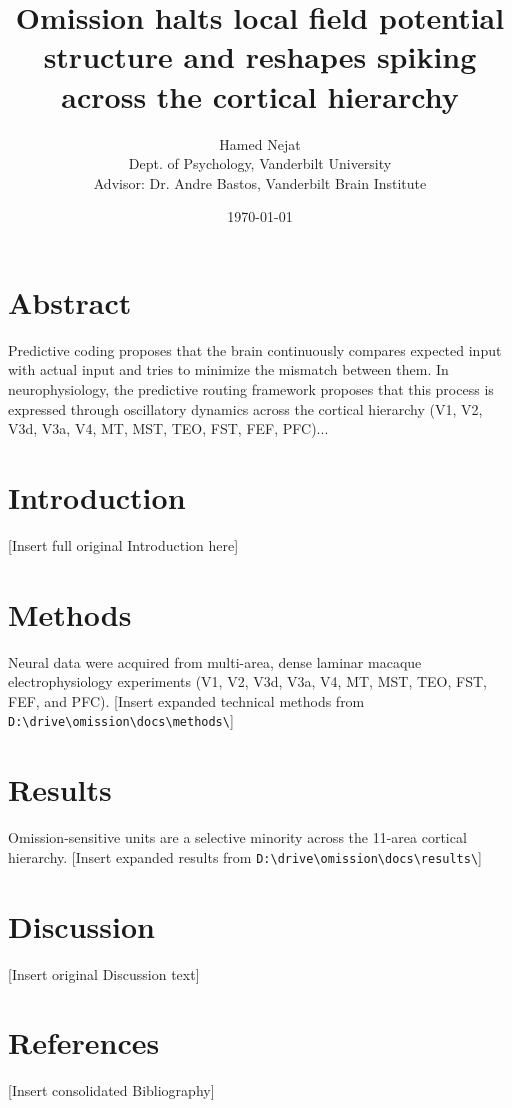 \documentclass[12pt]{article}
\title{Omission halts local field potential structure and reshapes spiking across the cortical hierarchy}
\author{Hamed Nejat \\ Dept. of Psychology, Vanderbilt University \\ Advisor: Dr. Andre Bastos, Vanderbilt Brain Institute}
\date{\today}
\begin{document}
\maketitle

\section*{Abstract}
Predictive coding proposes that the brain continuously compares expected input with actual input and tries to minimize the mismatch between them. In neurophysiology, the predictive routing framework proposes that this process is expressed through oscillatory dynamics across the cortical hierarchy (V1, V2, V3d, V3a, V4, MT, MST, TEO, FST, FEF, PFC)...

\section{Introduction}
[Insert full original Introduction here]

\section{Methods}
Neural data were acquired from multi-area, dense laminar macaque electrophysiology experiments (V1, V2, V3d, V3a, V4, MT, MST, TEO, FST, FEF, and PFC). 
[Insert expanded technical methods from \texttt{D:\textbackslash drive\textbackslash omission\textbackslash docs\textbackslash methods\textbackslash}]

\section{Results}
Omission-sensitive units are a selective minority across the 11-area cortical hierarchy.
[Insert expanded results from \texttt{D:\textbackslash drive\textbackslash omission\textbackslash docs\textbackslash results\textbackslash}]

\section{Discussion}
[Insert original Discussion text]

\section{References}
[Insert consolidated Bibliography]
\end{document}
